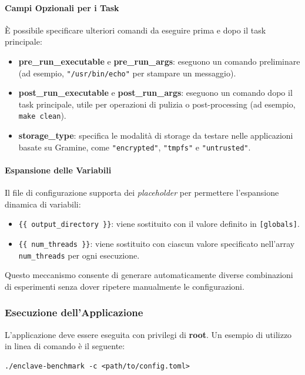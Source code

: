 \documentclass{article}
\begin{document}
\paragraph{Campi Opzionali per i Task}
È possibile specificare ulteriori comandi da eseguire prima e dopo il task principale:
\begin{itemize}
  \item \textbf{pre\_run\_executable} e \textbf{pre\_run\_args}: eseguono un comando preliminare (ad esempio, \texttt{"/usr/bin/echo"} per stampare un messaggio).
  \item \textbf{post\_run\_executable} e \textbf{post\_run\_args}: eseguono un comando dopo il task principale, utile per operazioni di pulizia o post-processing (ad esempio, \texttt{make clean}).
  \item \textbf{storage\_type}: specifica le modalità di storage da testare nelle applicazioni basate su Gramine, come \texttt{"encrypted"}, \texttt{"tmpfs"} e \texttt{"untrusted"}.
\end{itemize}

\paragraph{Espansione delle Variabili}
Il file di configurazione supporta dei \emph{placeholder} per permettere l'espansione dinamica di variabili:
\begin{itemize}
  \item \texttt{\{\{ output\_directory \}\}}: viene sostituito con il valore definito in \texttt{[globals]}.
  \item \texttt{\{\{ num\_threads \}\}}: viene sostituito con ciascun valore specificato nell'array \texttt{num\_threads} per ogni esecuzione.
\end{itemize}
Questo meccanismo consente di generare automaticamente diverse combinazioni di esperimenti senza dover ripetere manualmente le configurazioni.

\subsubsection*{Esecuzione dell'Applicazione}
L'applicazione deve essere eseguita con privilegi di \textbf{root}. Un esempio di utilizzo in linea di comando è il seguente:

\begin{verbatim}
./enclave-benchmark -c <path/to/config.toml>
\end{verbatim}
\end{document}
